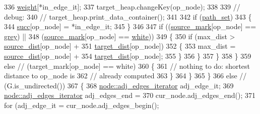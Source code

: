 \begin{DoxyCode}
336                 \mbox{\hyperlink{classbid__dijkstra_a477c4f7ce631df84c832cb7d517cd243}{weight}}[*in\_edge\_it];
337                 target\_heap.changeKey(op\_node);
338 
339                 \textcolor{comment}{// debug:}
340                 \textcolor{comment}{// target\_heap.print\_data\_container();}
341 
342                 \textcolor{keywordflow}{if} (\mbox{\hyperlink{classbid__dijkstra_aa7b329f69600fffae2753f87501dab9d}{path\_set}})
343                 \{
344                 \mbox{\hyperlink{classbid__dijkstra_a7379d185faf9af3820b8292676f9d88a}{succ}}[op\_node] = *in\_edge\_it;
345                 \}
346 
347                     \textcolor{keywordflow}{if} ((\mbox{\hyperlink{classbid__dijkstra_a1b3684b69db38c8eaf9d4fbb056bc392}{source\_mark}}[op\_node] == \mbox{\hyperlink{classbid__dijkstra_a8b7dcccc9fab2ec5edc8da01029c09d5a5e3971e0090719b93ed71811edcd7360}{grey}}) ||
348                     (\mbox{\hyperlink{classbid__dijkstra_a1b3684b69db38c8eaf9d4fbb056bc392}{source\_mark}}[op\_node] == \mbox{\hyperlink{classbid__dijkstra_a8b7dcccc9fab2ec5edc8da01029c09d5abbd36b03487d4100360b3d6e94309b7b}{white}}))
349                 \{
350                     \textcolor{keywordflow}{if} (max\_dist > \mbox{\hyperlink{classbid__dijkstra_a19dc6c350617f0fa5769e5c70781d658}{source\_dist}}[op\_node] +
351                     \mbox{\hyperlink{classbid__dijkstra_a7a46fe8fe075d798eaca14b37aa15c0d}{target\_dist}}[op\_node])
352                 \{
353                     max\_dist = \mbox{\hyperlink{classbid__dijkstra_a19dc6c350617f0fa5769e5c70781d658}{source\_dist}}[op\_node] +
354                     \mbox{\hyperlink{classbid__dijkstra_a7a46fe8fe075d798eaca14b37aa15c0d}{target\_dist}}[op\_node];
355                 \}
356                 \}
357             \}
358             \}
359             \textcolor{keywordflow}{else}    \textcolor{comment}{// (target\_mark[op\_node] == white)}
360             \{
361             \textcolor{comment}{// nothing to do: shortest distance to op\_node is}
362             \textcolor{comment}{//        already computed}
363             \}
364         \}
365         \}
366         \textcolor{keywordflow}{else}    \textcolor{comment}{// (G.is\_undirected())}
367         \{
368         \mbox{\hyperlink{classnode_a12cb1a2167f5f03c054de5e707d3156f}{node::adj\_edges\_iterator}} adj\_edge\_it;
369         \mbox{\hyperlink{classnode_a12cb1a2167f5f03c054de5e707d3156f}{node::adj\_edges\_iterator}} adj\_edges\_end =
370             cur\_node.adj\_edges\_end();
371         \textcolor{keywordflow}{for} (adj\_edge\_it = cur\_node.adj\_edges\_begin();

\end{DoxyCode}
